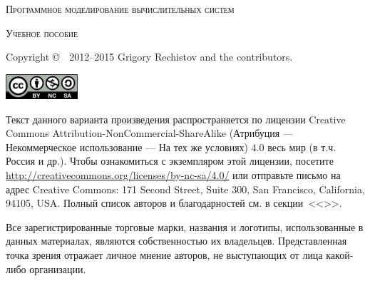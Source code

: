 
\thispagestyle{empty}


\begin{center}
    \Huge\textsc{Программное моделирование вычислительных систем}\par
\end{center}

\vspace{0.5cm}

\begin{center}
	\Large\textsc{Учебное пособие}\par
\end{center}


\newlength{\centeroffset}
\setlength{\centeroffset}{-0.5\oddsidemargin}
\addtolength{\centeroffset}{0.5\evensidemargin}
\noindent\hspace*{\centeroffset}

\pagebreak
\thispagestyle{empty}

\begin{small} 
Copyright \copyright~~2012--2015 Grigory Rechistov and the contributors. %
\begin{center}
    \includegraphics[width=0.2\textwidth]{cc-by-nc-sa.png}
\end{center}

Текст данного варианта произведения распространяется по лицензии Creative Commons At\-tri\-bu\-tion-Non\-Com\-mer\-cial-Share\-Alike (Атрибуция — Некоммерческое использование — На тех же условиях) 4.0 весь мир (в т.ч. Россия и др.). Чтобы ознакомиться с экземпляром этой лицензии, посетите \url{http://creativecommons.org/licenses/by-nc-sa/4.0/} или отправьте письмо на адрес Creative Commons: 171 Second Street, Suite 300, San Francisco, California, 94105, USA. 
Полный список авторов и благодарностей см. в секции~<<>>.

Все зарегистрированные торговые марки, названия и логотипы, использованные в данных материалах, являются собственностью их владельцев. Представленная точка зрения отражает личное мнение авторов, не выступающих от лица какой-либо организации.
\end{small}

